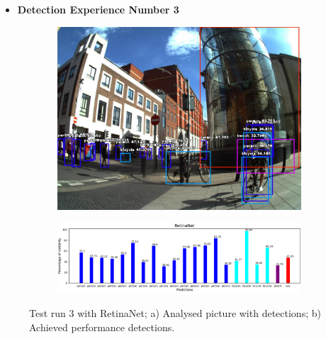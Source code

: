       \begin{itemize}
        \item \textbf{Detection Experience Number 3}
      \end{itemize}
    

      \begin{figure}[H]
        \centering
        \captionsetup{justification=centering}

        \begin{subfigure}{0.29\textwidth}
        \includegraphics[width=\textwidth]{Sections/4InitialWork/4_images_obj_run4/retinaNet.jpg} 
        \caption{}
        \end{subfigure}
        \begin{subfigure}{0.7\textwidth}
        \includegraphics[width=\textwidth]{Sections/4InitialWork/4_images_obj_run4/retinaNet_graph.png}
        \caption{}
        \end{subfigure}
        
        \caption{ 
        Test run 3 with RetinaNet; a) Analysed picture with detections; b) Achieved performance detections. }
        \end{figure}




